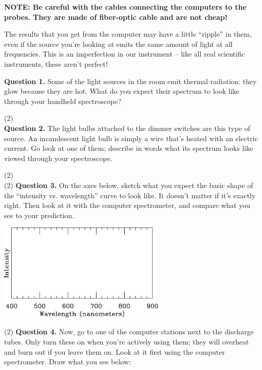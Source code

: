 \documentclass[11pt]{article}
\begin{document}
{\bf NOTE: Be careful with the cables connecting the computers to the probes. They are made of fiber-optic cable and are not cheap!}

The results that you get from the computer may have a little ``ripple'' in them, even if the source you're looking at emits the same amount of light at all frequencies. This is an imperfection in our instrument -- like all real scientific instruments, these aren't perfect!

\bigskip


\textbf{Question 1.} Some of the light sources in the room emit thermal radiation: they glow because they are hot. What do you expect their spectrum to look like through your handheld spectroscope?

\vspace{1.5cm}
(2) \hrulefill\\

\textbf{Question 2.} The light bulbs attached to the dimmer switches are this type of source. An incandescent light bulb is simply a wire that's heated with an electric current. Go look at one of them; describe in words what its spectrum looks like viewed through your spectroscope.

\vspace{1.5cm}
(2) \hrulefill\\


(2) \textbf{Question 3.} On the axes below, sketch what you expect the basic shape of the ``intensity vs. wavelength'' curve to look like. It doesn't matter if it's exactly right. Then look at it with the computer spectrometer, and compare what you see to your prediction.

\begin{center}
	\includegraphics[width=0.6\textwidth]{spectrumplot-blank.pdf}
\end{center}
\newpage
(2) \textbf{Question 4.} Now, go to one of the computer stations next to the discharge tubes. Only turn these on when you're actively using them; they will overheat and burn out if you leave them on. Look at it first using the computer spectrometer. Draw what you see below:
\end{document}
